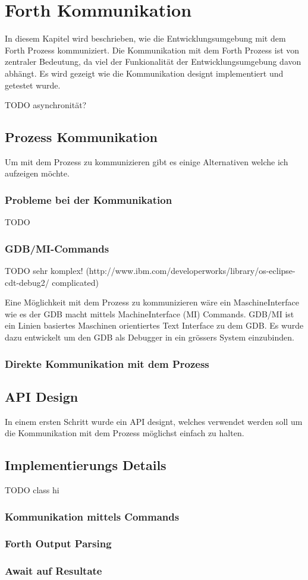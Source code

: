\chapter{Forth Kommunikation}
\label{forthcommunication}

In diesem Kapitel wird beschrieben, wie die Entwicklungsumgebung mit dem Forth Prozess kommuniziert. Die Kommunikation mit dem Forth Prozess ist von zentraler Bedeutung, da viel der Funkionalität der Entwicklungsumgebung davon abhängt. Es wird gezeigt wie die Kommunikation designt implementiert und getestet wurde.

TODO asynchronität?


\section{Prozess Kommunikation}
Um mit dem Prozess zu kommunizieren gibt es einige Alternativen welche ich aufzeigen möchte.

\subsection{Probleme bei der Kommunikation}

TODO 

\subsection{GDB/MI-Commands}

TODO sehr komplex! (http://www.ibm.com/developerworks/library/os-eclipse-cdt-debug2/ complicated)

Eine Möglichkeit mit dem Prozess zu kommunizieren wäre ein MaschineInterface wie es der GDB macht mittels MachineInterface (MI)  Commands. GDB/MI ist ein Linien basiertes Maschinen orientiertes Text Interface zu dem GDB. Es wurde dazu entwickelt um den GDB als Debugger in ein grössers System einzubinden. \cite{gdb}

\subsection{Direkte Kommunikation mit dem Prozess}

\section{API Design}

In einem ersten Schritt wurde ein API designt, welches verwendet werden soll um die Kommunikation mit dem Prozess möglichst einfach zu halten.

\section{Implementierungs Details}

TODO class hi

\subsection{Kommunikation mittels Commands}

\subsection{Forth Output Parsing}

\subsection{Await auf Resultate}

